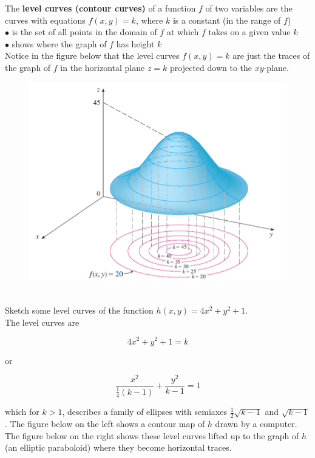        The \textbf{level curves (contour curves)} of a function $f$ of two variables are the curves with equations $f(x,y)=k$, where $k$ is a constant (in the range of $f$) \\
        $\bullet$ is the set of all points in the domain of $f$ at which $f$ takes on a given value $k$ \\
        $\bullet$ shows where the graph of $f$ has height $k$ \\

        Notice in the figure below that the level curves $f(x,y) = k$ are just the traces of the graph of $f$ in the horizontal plane $z=k$ projected down to the $xy$-plane.

        \begin{figure}[hbt!]
            \centering
            \includegraphics[scale = 0.75]{Resources/14.1_Contour_Traces}
        \end{figure}

        \textit{} \\

        Sketch some level curves of the function $h(x,y) = 4x^2 + y^2 + 1$. \\

        The level curves are

        \[
            4x^2 + y^2 + 1 = k
        \]

        or

        \[
            \frac{x^2}{\frac{1}{4}(k-1)} + \frac{y^2}{k-1} = 1
        \]

        which for $k > 1$, describes a family of ellipses with semiaxes $\frac{1}{2}\sqrt{k-1}$ and $\sqrt{k-1}$. The figure below on the left shows a contour map of $h$ drawn by a computer. The figure below on the right
        shows these level curves lifted up to the graph of $h$ (an elliptic paraboloid) where they become horizontal traces.

